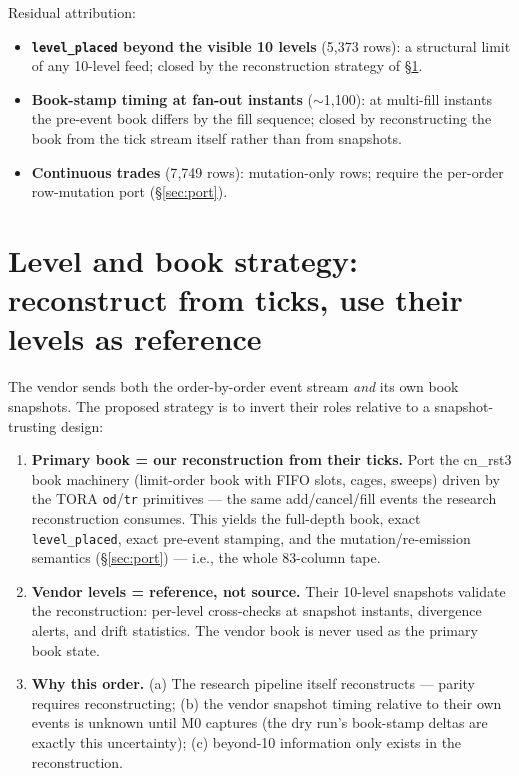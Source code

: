 \documentclass[11pt,a4paper]{article}
\begin{document}
Residual attribution:
\begin{itemize}
  \item \textbf{\texttt{level\_placed} beyond the visible 10 levels}
        (5{,}373 rows): a structural limit of any 10-level feed; closed by
        the reconstruction strategy of \S\ref{sec:strategy}.
  \item \textbf{Book-stamp timing at fan-out instants} ($\sim$1{,}100):
        at multi-fill instants the pre-event book differs by the fill
        sequence; closed by reconstructing the book from the tick stream
        itself rather than from snapshots.
  \item \textbf{Continuous trades} (7{,}749 rows): mutation-only rows;
        require the per-order row-mutation port (\S\ref{sec:port}).
\end{itemize}

\section{Level and book strategy: reconstruct from ticks, use their levels
as reference}
\label{sec:strategy}

The vendor sends both the order-by-order event stream \emph{and} its own
book snapshots. The proposed strategy is to invert their roles relative to
a snapshot-trusting design:

\begin{enumerate}
  \item \textbf{Primary book = our reconstruction from their ticks.} Port
        the cn\_rst3 book machinery (limit-order book with FIFO slots, cages,
        sweeps) driven by the TORA \texttt{od}/\texttt{tr} primitives --- the
        same add/cancel/fill events the research reconstruction consumes.
        This yields the full-depth book, exact \texttt{level\_placed}, exact
        pre-event stamping, and the mutation/re-emission semantics
        (\S\ref{sec:port}) --- i.e., the whole 83-column tape.
  \item \textbf{Vendor levels = reference, not source.} Their 10-level
        snapshots validate the reconstruction: per-level cross-checks at
        snapshot instants, divergence alerts, and drift statistics. The
        vendor book is never used as the primary book state.
  \item \textbf{Why this order.} (a) The research pipeline itself
        reconstructs --- parity requires reconstructing; (b) the vendor
        snapshot timing relative to their own events is unknown until M0
        captures (the dry run's book-stamp deltas are exactly this
        uncertainty); (c) beyond-10 information only exists in the
        reconstruction.
\end{enumerate}
\end{document}
